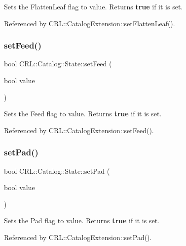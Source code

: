 Sets the Flatten\+Leaf flag to {\ttfamily value}. Returns {\bfseries true} if it is set. 

Referenced by C\+R\+L\+::\+Catalog\+Extension\+::set\+Flatten\+Leaf().

\mbox{\label{classCRL_1_1Catalog_1_1State_ab5936e80369947177be88c3d770f4725}} 
\subsubsection{\texorpdfstring{set\+Feed()}{setFeed()}}
{\footnotesize\ttfamily bool C\+R\+L\+::\+Catalog\+::\+State\+::set\+Feed (\begin{DoxyParamCaption}\item[{bool}]{value }\end{DoxyParamCaption})\hspace{0.3cm}{\ttfamily [inline]}}

Sets the Feed flag to {\ttfamily value}. Returns {\bfseries true} if it is set. 

Referenced by C\+R\+L\+::\+Catalog\+Extension\+::set\+Feed().

\mbox{\label{classCRL_1_1Catalog_1_1State_a97e2158809ed0e88237bb92eb8daa290}} 
\subsubsection{\texorpdfstring{set\+Pad()}{setPad()}}
{\footnotesize\ttfamily bool C\+R\+L\+::\+Catalog\+::\+State\+::set\+Pad (\begin{DoxyParamCaption}\item[{bool}]{value }\end{DoxyParamCaption})\hspace{0.3cm}{\ttfamily [inline]}}

Sets the Pad flag to {\ttfamily value}. Returns {\bfseries true} if it is set. 

Referenced by C\+R\+L\+::\+Catalog\+Extension\+::set\+Pad().

\mbox{\label{classCRL_1_1Catalog_1_1State_acc0c819f382393dc780bb19c7788b216}} 

